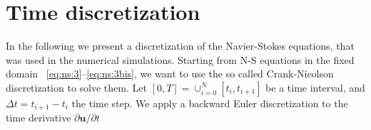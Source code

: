 \documentclass[a4paper,11pt,oneside]{book}
\begin{document}
%




\section{Time discretization}

In the following we present a discretization of the Navier-Stokes equations, that was used in the numerical simulations. Starting from N-S equations in the fixed domain ~\eqref{eq:ns:3}--\eqref{eq:ns:3bis}, we want to use the so called Crank-Nicolson discretization to solve them. Let $[0, T] = \cup^N_{i=0} [t_i, t_{i+1}] $ be a time interval, and $\Delta t = t_{i+1} - t_i$ the time step. We apply a backward Euler discretization to the time derivative $\partial \mathbf{u}/ \partial t$
\end{document}
